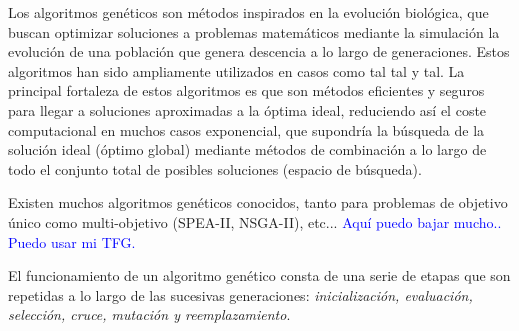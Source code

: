 \documentclass{uathesis-es}
\begin{document}
Los algoritmos genéticos son métodos inspirados en la evolución biológica, que buscan optimizar soluciones a problemas matemáticos mediante la simulación la evolución de una población que genera descencia a lo largo de generaciones. Estos algoritmos han sido ampliamente utilizados en casos como tal tal y tal. La principal fortaleza de estos algoritmos es que son métodos eficientes y seguros para llegar a soluciones aproximadas a la óptima ideal, reduciendo así el coste computacional en muchos casos exponencial, que supondría la búsqueda de la solución ideal (óptimo global) mediante métodos de combinación a lo largo de todo el conjunto total de posibles soluciones (espacio de búsqueda).

Existen muchos algoritmos genéticos conocidos, tanto para problemas de objetivo único como multi-objetivo (SPEA-II, NSGA-II), etc... \textcolor{blue}{Aquí puedo bajar mucho.. Puedo usar mi TFG.}

El funcionamiento de un algoritmo genético consta de una serie de etapas que son repetidas a lo largo de las sucesivas generaciones: \textit{inicialización, evaluación, selección, cruce, mutación y reemplazamiento}.
\end{document}
